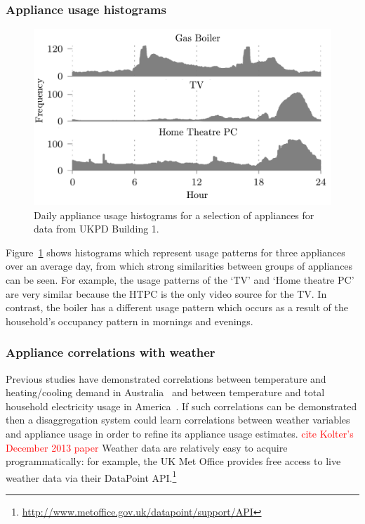 \documentclass{sig-alternate}
\newcommand{\redcolor}[1]{\textcolor{red}{#1}}
\newcommand{\bluecolor}[1]{\textcolor{blue}{#1}}
\begin{document}
\subsubsection{Appliance usage histograms}
\label{sec:usage_hist}
\begin{figure}[!t]
  \centering
  \includegraphics[width=\columnwidth]{figures/daily_usage_histograms3.pdf}
  \caption{Daily appliance usage histograms for a selection of
    appliances for data from UKPD Building 1.}
  \label{fig:daily_usage_histograms}
\end{figure} 

\noindent
Figure~\ref{fig:daily_usage_histograms} shows histograms which represent usage patterns for three appliances over
an average day, from which strong similarities between groups of appliances can be seen.  For
example, the usage patterns of the `TV' and `Home theatre PC' are very
similar because the HTPC is the only video source for the TV. In contrast, the boiler has a different usage pattern which occurs as a result of the household's occupancy pattern in mornings and evenings.

\subsubsection{Appliance correlations with weather}
\label{sec:weather_correlation}
\noindent
Previous studies have demonstrated correlations
between temperature and heating/cooling demand in
Australia~\cite{RicharddeDear2002} and between temperature and total
household electricity usage in America~\cite{Kavousian2013a}.  
If such correlations can be demonstrated then a disaggregation
system could learn correlations between weather variables and
appliance usage in order to refine its appliance usage estimates. \redcolor{cite Kolter's December 2013 paper}
Weather data are relatively easy to acquire programmatically: for
example, the UK Met Office provides free access to live weather data
via their DataPoint API.\footnote{\url{http://www.metoffice.gov.uk/datapoint/support/API}}
\end{document}
